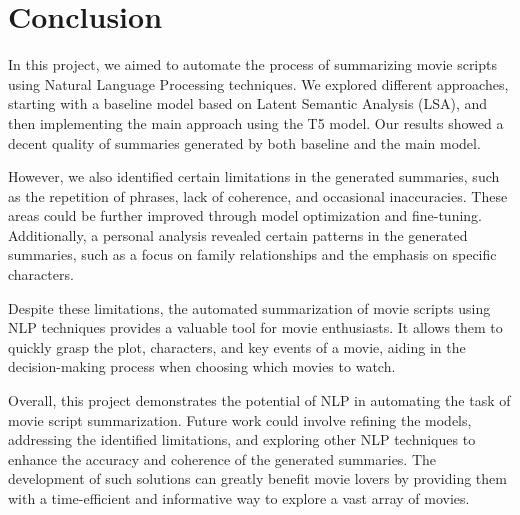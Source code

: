 \documentclass[fleqn,moreauthors,10pt]{ds_report}
\begin{document}
\section*{Conclusion}

In this project, we aimed to automate the process of summarizing movie scripts using Natural Language Processing techniques. We explored different approaches, starting with a baseline model based on Latent Semantic Analysis (LSA), and then implementing the main approach using the T5 model. Our results showed a decent quality of summaries generated by both baseline and the main model.

However, we also identified certain limitations in the generated summaries, such as the repetition of phrases, lack of coherence, and occasional inaccuracies. These areas could be further improved through model optimization and fine-tuning. Additionally, a personal analysis revealed certain patterns in the generated summaries, such as a focus on family relationships and the emphasis on specific characters.

Despite these limitations, the automated summarization of movie scripts using NLP techniques provides a valuable tool for movie enthusiasts. It allows them to quickly grasp the plot, characters, and key events of a movie, aiding in the decision-making process when choosing which movies to watch.

Overall, this project demonstrates the potential of NLP in automating the task of movie script summarization. Future work could involve refining the models, addressing the identified limitations, and exploring other NLP techniques to enhance the accuracy and coherence of the generated summaries. The development of such solutions can greatly benefit movie lovers by providing them with a time-efficient and informative way to explore a vast array of movies.


\end{document}
